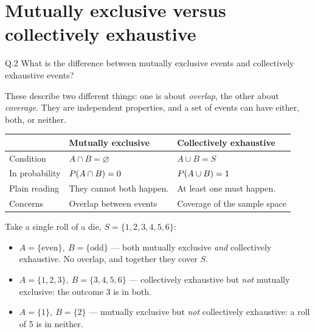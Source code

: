 \section{Mutually exclusive versus collectively exhaustive}

\begin{question}{Q.2}
What is the difference between mutually exclusive events and collectively
exhaustive events?
\end{question}

\begin{solution}
These describe two different things: one is about \emph{overlap}, the other
about \emph{coverage}. They are independent properties, and a set of events can
have either, both, or neither.

\begin{center}
\small\sffamily
\begin{tabular}{@{}L{3.4cm} L{5.4cm} L{5.4cm}@{}}
\toprule
 & \textbf{Mutually exclusive} & \textbf{Collectively exhaustive} \\
\midrule
Condition & $A\cap B=\varnothing$ & $A\cup B=S$ \\
In probability & $P\!\left(A\cap B\right)=0$ & $P\!\left(A\cup B\right)=1$ \\
Plain reading & They cannot both happen. & At least one must happen. \\
Concerns & Overlap between events & Coverage of the sample space \\
\bottomrule
\end{tabular}
\end{center}

Take a single roll of a die, $S=\{1,2,3,4,5,6\}$:

\begin{itemize}
  \item $A=\{\text{even}\},\ B=\{\text{odd}\}$ --- both mutually exclusive
        \emph{and} collectively exhaustive. No overlap, and together they
        cover $S$.
  \item $A=\{1,2,3\},\ B=\{3,4,5,6\}$ --- collectively exhaustive but
        \emph{not} mutually exclusive: the outcome 3 is in both.
  \item $A=\{1\},\ B=\{2\}$ --- mutually exclusive but \emph{not}
        collectively exhaustive: a roll of 5 is in neither.
\end{itemize}

\end{solution}

